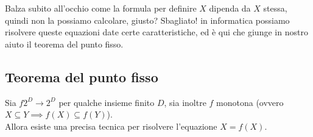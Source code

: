\documentclass[class=book, crop=false, oneside, 12pt]{standalone}
\begin{document}
Balza subito all'occhio come la formula per definire \(X\) dipenda da \(X\) stessa, quindi non la possiamo calcolare, giusto? 
Sbagliato! in informatica possiamo risolvere queste equazioni date certe caratteristiche, ed è qui che giunge in nostro aiuto il teorema del punto fisso.


\subsection{Teorema del punto fisso}
\begin{theorem}
    Sia \(f 2^D \to 2^D\) per qualche insieme finito \(D\), sia inoltre \( f \) monotona (ovvero \(X \subseteq Y \implies f(X) \subseteq f(Y)\)).\\
    Allora esiste una precisa tecnica per risolvere l'equazione \(X = f(X)\).
\end{theorem}
\end{document}
